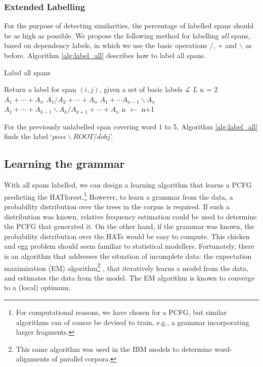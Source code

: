 \subsubsection{Extended Labelling}

For the purpose of detecting similarities, the percentage of labelled spans should be as high as possible. We propose the following method for labelling \textit{all} spans, based on dependency labels, in which we use the basic operations $/$, $+$ and $\backslash$ as before. Algorithm \ref{alg:label_all} describes how to label all spans.

\begin{algorithm}
\caption{Label all spans}\label{alg:label_all}
\begin{algorithmic}
\STATE Return a label for span $(i,j)$, given a set of basic labels $\mathcal{L}$
		\RETURN $L$
\ELSE
	\STATE n = 2
			\RETURN $A_1+\cdots+A_n$
			\RETURN $A_1/A_2+\cdots+A_n$
			\RETURN $A_1+\cdots A_{n-1}\backslash A_n$
		\RETURN $A_1+\cdots+A_{k-1}\backslash A_k/A_{k+1}+\cdots+A_n$
		\ELSE
			\STATE n $\leftarrow$ n+1
		\ENDIF
	\ENDWHILE
\ENDIF
\end{algorithmic}
\end{algorithm}

For the previously unlabelled span covering word 1 to 5, Algorithm \ref{alg:label_all} finds the label `$poss\backslash ROOT/dobj$'.

\subsection{Learning the grammar}

With all spans labelled, we can design a learning algorithm that learns a PCFG predicting the HATforest.\footnote{For computational reasons, we have chosen for a PCFG, but similar algorithms can of course be devised to train, e.g., a grammar incorporating larger fragments.} However, to learn a grammar from the data, a probability distribution over the trees in the corpus is required. If such a distribution was known, relative frequency estimation could be used to determine the PCFG that generated it. On the other hand, if the grammar was known, the probability distribution over the HATs would be easy to compute. This chicken and egg problem should seem familiar to statistical modellers. Fortunately, there is an algorithm that addresses the situation of incomplete data: the expectation maximization (EM) algorithm\footnote{This same algorithm was used in the IBM models to determine word-alignments of parallel corpora.} \citep{dempster1977maximum}, that iteratively learns a model from the data, and estimates the data from the model. The EM algorithm is known to converge to a (local) optimum.

